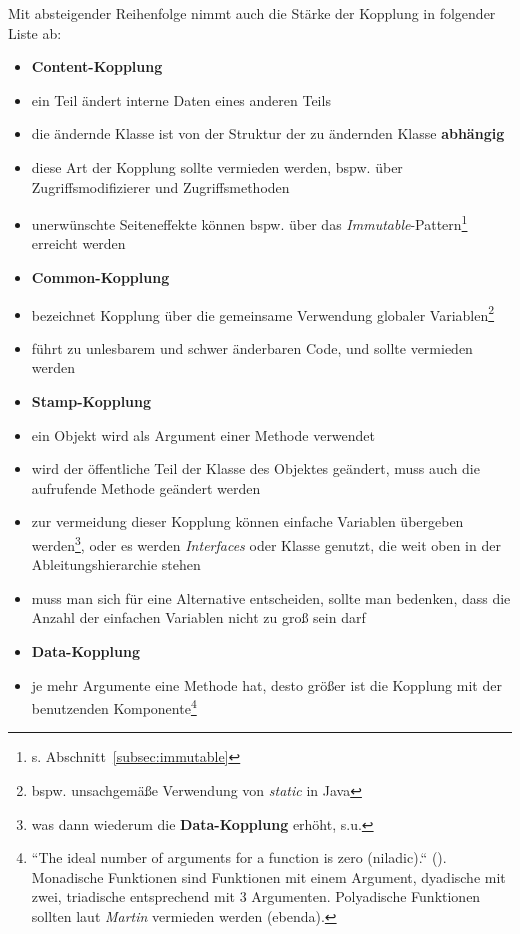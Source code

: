 \noindent
Mit absteigender Reihenfolge nimmt auch die Stärke der Kopplung in folgender Liste ab:


\begin{itemize}
    \item \textbf{Content-Kopplung}
    \item[] ein Teil ändert interne Daten eines anderen Teils
    \item[] die ändernde Klasse ist von der Struktur der zu ändernden Klasse \textbf{abhängig}
    \item[] diese Art der Kopplung sollte vermieden werden, bspw. über Zugriffsmodifizierer und Zugriffsmethoden
    \item[] unerwünschte Seiteneffekte können bspw. über das \textit{Immutable}-Pattern\footnote{
    s. Abschnitt~\ref{subsec:immutable}
    } erreicht werden
    \item \textbf{Common-Kopplung}
    \item[] bezeichnet Kopplung über die gemeinsame Verwendung globaler Variablen\footnote{
        bspw. unsachgemäße Verwendung von \textit{static} in Java
    }
    \item[] führt zu unlesbarem und schwer änderbaren Code, und sollte vermieden werden
    \item \textbf{Stamp-Kopplung}
    \item[] ein Objekt wird als Argument einer Methode verwendet
    \item[] wird der öffentliche Teil der Klasse des Objektes geändert, muss auch die aufrufende Methode geändert werden
    \item[] zur vermeidung dieser Kopplung können einfache Variablen übergeben werden\footnote{
        was dann wiederum die \textbf{Data-Kopplung} erhöht, s.u.
    }, oder es werden \textit{Interfaces} oder Klasse genutzt, die weit oben in der Ableitungshierarchie stehen
    \item[] muss man sich für eine Alternative entscheiden, sollte man bedenken, dass die Anzahl der einfachen Variablen nicht zu groß sein darf
    \item \textbf{Data-Kopplung}
    \item[] je mehr Argumente eine Methode hat, desto größer ist die Kopplung mit der benutzenden Komponente\footnote{
    ``The ideal number of arguments for a function is zero (niladic).`` (\cite[40]{Mar08}). Monadische Funktionen sind Funktionen mit einem Argument, dyadische mit zwei, triadische entsprechend mit 3 Argumenten. Polyadische Funktionen sollten laut \textit{Martin} vermieden werden (ebenda).
}
\end{itemize}
